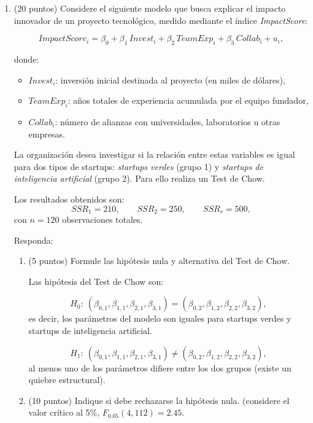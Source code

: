 \documentclass[10pt,a4paper]{article}
\begin{document}
\begin{enumerate}
    \item (20 puntos) 
Considere el siguiente modelo que busca explicar el impacto innovador de un proyecto tecnológico,
medido mediante el índice \textit{ImpactScore}:

\[
ImpactScore_i
= \beta_0 
+ \beta_1\, Invest_i
+ \beta_2\, TeamExp_i
+ \beta_3\, Collab_i
+ u_i,
\]

donde:
\begin{itemize}
    \item $Invest_i$: inversión inicial destinada al proyecto (en miles de dólares),
    \item $TeamExp_i$: años totales de experiencia acumulada por el equipo fundador,
    \item $Collab_i$: número de alianzas con universidades, laboratorios u otras empresas.
\end{itemize}

La organización desea investigar si la relación entre estas variables es igual para dos tipos de startups:
\textit{startups verdes} (grupo 1) y \textit{startups de inteligencia artificial} (grupo 2). Para ello realiza un Test de Chow.

Los resultados obtenidos son:
\[
SSR_1 = 210, \qquad SSR_2 = 250, \qquad SSR_r = 500,
\]
con $n = 120$ observaciones totales.

Responda:

\begin{enumerate}
    \item[(a)] (5 puntos) Formule las hipótesis nula y alternativa del Test de Chow.


 \color{blue}
Las hipótesis del Test de Chow son:
    
    \[
    H_0:\ 
    (\beta_{0,1},\beta_{1,1},\beta_{2,1},\beta_{3,1})
    =
    (\beta_{0,2},\beta_{1,2},\beta_{2,2},\beta_{3,2}),
    \]
    es decir, los parámetros del modelo son iguales para startups verdes y startups de inteligencia artificial.
    
    \[
    H_1:\ 
    (\beta_{0,1},\beta_{1,1},\beta_{2,1},\beta_{3,1})
    \neq
    (\beta_{0,2},\beta_{1,2},\beta_{2,2},\beta_{3,2}),
    \]
    al menos uno de los parámetros difiere entre los dos grupos (existe un quiebre estructural).

\color{black}

    \item[(b)] (10 puntos) Indique si debe rechazarse la hipótesis nula. (considere el valor crítico al 5\%,
    $F_{0.05}(4,112)=2.45$.
\color{blue}


\end{enumerate}
\end{enumerate}
\end{document}
